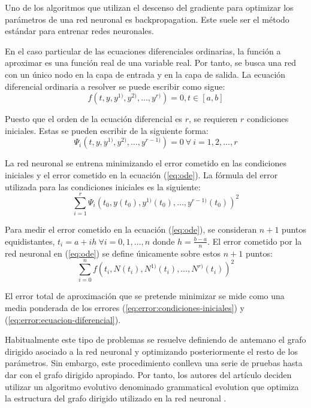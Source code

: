 \documentclass{article}
\theoremstyle{theorem-style}  %
\theoremstyle{definition-style}
\theoremstyle{example-style}
\begin{document}
	Uno de los algoritmos que utilizan el descenso del gradiente para optimizar los parámetros de una red neuronal es backpropagation. Este suele ser el método estándar para entrenar redes neuronales.
	
	En el caso particular de las ecuaciones diferenciales ordinarias, la función a aproximar es una función real de una variable real. Por tanto, se busca una red con un único nodo en la capa de entrada y en la capa de salida. La ecuación diferencial ordinaria a resolver se puede escribir como sigue:
	\begin{equation} \label{eq:ode}
		f(t, y, y^{1)}, y^{2)}, \ldots, y^{r)}) = 0, t \in [a,b]
	\end{equation}
	
	
	Puesto que el orden de la ecuación diferencial es $r$, se requieren $r$ condiciones iniciales. Estas se pueden escribir de la siguiente forma:
	\begin{equation}
		\Psi_i(t, y, y^{1)}, y^{2)}, \ldots, y^{r-1)}) = 0 \ \forall \ i = 1, 2, \ldots, r
	\end{equation}
	
	La red neuronal se entrena minimizando el error cometido en las condiciones iniciales y el error cometido en la ecuación (\ref{eq:ode}). La fórmula del error utilizada para las condiciones iniciales es la siguiente:
	\begin{equation} \label{eq:error:condiciones-iniciales}
		\sum_{i=1}^{r}\Psi_i(t_0, y(t_0), y^{1)}(t_0), \ldots, y^{r-1)}(t_0))^2
	\end{equation}
	
	Para medir el error cometido en la ecuación (\ref{eq:ode}), se consideran $n+1$ puntos equidistantes, $t_i = a + ih \ \forall i = 0, 1, \dots, n$ donde $h = \frac{b-a}{n}$. El error cometido por la red neuronal en (\ref{eq:ode}) se define únicamente sobre estos $n+1$ puntos:
	\begin{equation} \label{eq:error:ecuacion-diferencial}
	\sum_{i=0}^{n}f(t_i, N(t_i), N^{1)}(t_i), \ldots, N^{r)}(t_i))^2
	\end{equation}
	
	El error total de aproximación que se pretende minimizar se mide como una media ponderada de los errores (\ref{eq:error:condiciones-iniciales}) y (\ref{eq:error:ecuacion-diferencial}).
	
	Habitualmente este tipo de problemas se resuelve definiendo de antemano el grafo dirigido asociado a la red neuronal y optimizando posteriormente el resto de los parámetros. Sin embargo, este procedimiento conlleva una serie de pruebas hasta dar con el grafo dirigido apropiado. Por tanto, los autores del artículo deciden utilizar un algoritmo evolutivo denominado grammatical evolution que optimiza la estructura del grafo dirigido utilizado en la red neuronal \cite{grammatical-evolution}. 
	
\end{document}
